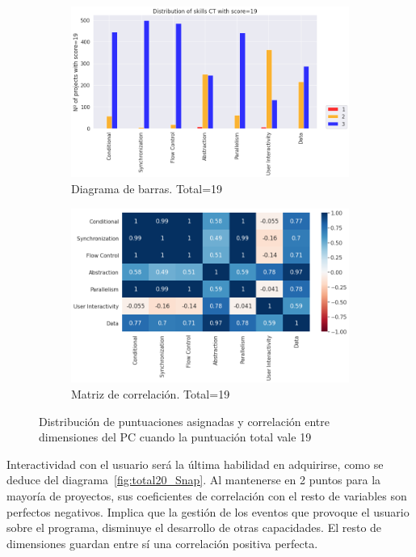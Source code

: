 \documentclass[a4paper, 12pt]{book}
\begin{document}
\begin{figure}[H]
    \centering
    \begin{subfigure}[h]{.49\textwidth} 
        \includegraphics[width=\textwidth]{img/distribucion_19_Snap}
        \caption{Diagrama de barras. Total=19}
        \label{fig:total19_Snap}
    \end{subfigure}       
    \begin{subfigure}[h]{.49\textwidth} 
        \includegraphics[width=\textwidth]{img/corr_19_Snap}
        \caption{Matriz de correlación. Total=19}
        \label{fig:corr19_Snap}
    \end{subfigure}
    \caption{Distribución de puntuaciones asignadas y correlación entre dimensiones del PC cuando la puntuación total vale 19}
\end{figure}

Interactividad con el usuario será la última habilidad en adquirirse, como se deduce del diagrama~\ref{fig:total20_Snap}. Al mantenerse en 2 puntos para la mayoría de proyectos, sus coeficientes de correlación con el resto de variables son perfectos negativos. Implica que la gestión de los eventos que provoque el usuario sobre el programa, disminuye el desarrollo de otras capacidades. El resto de dimensiones guardan entre sí una correlación positiva perfecta.
\end{document}
